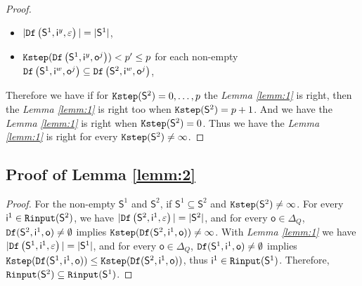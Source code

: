 \begin{appendices}
\begin{proof}
\begin{itemize}
 \item  $|{\tt Df}\left(\mathsf{S}^{1},\mathsf{i}^{y},\varepsilon\right)|=|\mathsf{S}^1|$,
 \item  ${\tt Kstep}({\tt Df}\left(\mathsf{S}^{1},\mathsf{i}^{y},\mathsf{o}^{j}\right))<p'\le p$ for each non-empty ${\tt Df}\left(\mathsf{S}^{1},\mathsf{i}^{w},\mathsf{o}^{j}\right)\subseteq {\tt Df}\left(\mathsf{S}^{2},\mathsf{i}^{w},\mathsf{o}^{j}\right)$,
 \end{itemize} 
 Therefore we have if for ${\tt Kstep}(\mathsf{S}^{2})=0,\ldots, p$ the {\em Lemma \ref{lemm:1}} is right, then the {\em Lemma \ref{lemm:1}} is right too when ${\tt Kstep}(\mathsf{S}^{2})=p+1$. 
And we have the {\em Lemma \ref{lemm:1}} is right when ${\tt Kstep}(\mathsf{S}^{2})=0$. Thus we have the {\em Lemma \ref{lemm:1}} is right for every ${\tt Kstep}(\mathsf{S}^{2})\ne \infty$.
 
\end{proof}
\subsection{Proof of Lemma \ref{lemm:2}}
\begin{proof}
For the non-empty $\mathsf{S}^{1}$ and $\mathsf{S}^{2}$, if $\mathsf{S}^{1}\subseteq\mathsf{S}^{2}$ and ${\tt Kstep}(\mathsf{S}^{2})\ne\infty$.
For every $\mathsf{i}^1\in {\tt Rinput}(\mathsf{S}^2)$, we have  $|{\tt Df}\left(\mathsf{S}^2,\mathsf{i}^1,\varepsilon\right)|=|\mathsf{S}^2|$, and 
for every $\mathsf{o} \in \Delta_Q$, ${\tt Df}(\mathsf{S}^2,\mathsf{i}^1,\mathsf{o})\ne \emptyset$ implies ${\tt Kstep}({\tt Df}(\mathsf{S}^2,\mathsf{i}^1,\mathsf{o}))\ne \infty$. With {\em Lemma \ref{lemm:1}} we have $|{\tt Df}\left(\mathsf{S}^1,\mathsf{i}^1,\varepsilon\right)|=|\mathsf{S}^1|$, and 
for every $\mathsf{o} \in \Delta_Q$, ${\tt Df}(\mathsf{S}^1,\mathsf{i}^1,\mathsf{o})\ne \emptyset$ implies ${\tt Kstep}({\tt Df}(\mathsf{S}^1,\mathsf{i}^1,\mathsf{o}))\le {\tt Kstep}({\tt Df}(\mathsf{S}^2,\mathsf{i}^1,\mathsf{o}))$, thus $\mathsf{i}^1\in {\tt Rinput}(\mathsf{S}^1)$. Therefore, ${\tt Rinput}(\mathsf{S}^2)\subseteq{\tt Rinput}(\mathsf{S}^1)$.
\end{proof}



\end{appendices}
